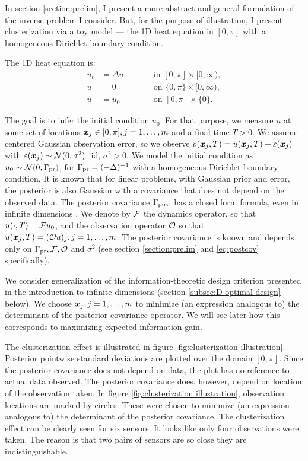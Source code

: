 In section \ref{section:prelim}, I present a more abstract and general
formulation of the inverse problem I consider. But, for the purpose of
illustration, I present clusterization via a toy model --- the 1D heat
equation in $[0,\pi]$ with a homogeneous Dirichlet boundary condition.

The 1D heat equation is:
\begin{subequations}\label{eq:heat equation}
  \begin{alignat}{2}
    u_t &= \Delta u &&\qquad \text{in } [0,\pi] \times [0,\infty),\\
      u &= 0 &&\qquad \text{on } \{0, \pi\} \times [0,\infty),\\
        u &= u_0 &&\qquad \text{on }[0,\pi] \times \{0\}.
  \end{alignat}
\end{subequations}

The goal is to infer the initial condition $u_0$. For that purpose, we
measure $u$ at some set of locations ${\boldsymbol{x}}_j \in [0,\pi], j=1, \dots,m$
and a final time $T > 0$. We assume centered Gaussian observation
error, so we observe $v({\boldsymbol{x}}_j,T) = u({\boldsymbol{x}}_j,T) + \varepsilon({\boldsymbol{x}}_j)$ with
$\varepsilon({\boldsymbol{x}}_j) \sim \mathcal{N}(0, \sigma^2)$ iid, $\sigma^2 > 0$. We model
the initial condition as $u_0 \sim \mathcal{N}(0,\Gamma_{\textup{pr}})$, for $\Gamma_{\textup{pr}} =
(-\Delta)^{-1}$ with a homogeneous Dirichlet boundary condition. It is
known \cite{Tarantola05} that for linear problems, with Gaussian prior
and error, the posterior is also Gaussian with a covariance that does
not depend on the observed data. The posterior covariance $\Gamma_{\textup{post}}$
has a closed form formula, even in infinite dimensions
\cite{Stuart10}. We denote by $\mathcal{F}$ the dynamics operator, so that
$u( \cdot,T) = \mathcal{F} u_0$, and the observation operator $\mathcal{O}$ so that
$u({\boldsymbol{x}}_j,T) = (\mathcal{O} u)_j, j=1,\dots,m$. The posterior covariance is
known and depends only on $\Gamma_{\textup{pr}}, \mathcal{F}, \mathcal{O}$ and $\sigma^2$ (see
section \ref{section:prelim} and \eqref{eq:postcov} specifically).

We consider generalization of the information-theoretic design
criterion presented in the introduction to infinite dimensions
(section \ref{subsec:D optimal design} below). We choose
${\boldsymbol{x}}_j,j=1,\dots,m$ to minimize (an expression analogous to) the
determinant of the posterior covariance operator. We will see later
how this corresponds to maximizing expected information gain.

The clusterization effect is illustrated in figure
\ref{fig:clusterization illustration}. Posterior pointwise standard
deviations are plotted over the domain $[0, \pi]$. Since the posterior
covariance does not depend on data, the plot has no reference to
actual data observed. The posterior covariance does, however, depend
on location of the observation taken. In figure
\ref{fig:clusterization illustration}, observation locations are
marked by circles. These were chosen to minimize (an expression
analogous to) the determinant of the posterior covariance. The
clusterization effect can be clearly seen for six sensors. It looks
like only four observations were taken. The reason is that two pairs
of sensors are so close they are indistinguishable.


